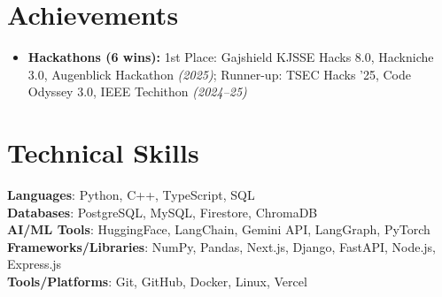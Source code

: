 \documentclass[letterpaper,11pt]{article}
\newcommand{\resumeItem}[1]{
  \item\normalsize{
    {#1 \vspace{-2pt}}
  }
}
\newcommand{\resumeSubHeadingListStart}{\begin{itemize}[leftmargin=0.15in, label={}]}
\newcommand{\resumeSubHeadingListEnd}{\end{itemize}}
\begin{document}
\section{Achievements}
    \resumeSubHeadingListStart      
\resumeItem{\textbf{Hackathons (6 wins):} 1st Place: Gajshield KJSSE Hacks 8.0, 
Hackniche 3.0, Augenblick Hackathon \textit{(2025)}; 
Runner-up: TSEC Hacks '25, Code Odyssey 3.0, IEEE Techithon \textit{(2024--25)}}
    \resumeSubHeadingListEnd

%
\section{Technical Skills}
 \begin{itemize}[leftmargin=0.15in, label={}]
    \small{\item{
     \textbf{Languages}{: Python, C++, TypeScript, SQL} \\
     \textbf{Databases}{: PostgreSQL, MySQL, Firestore, ChromaDB} \\
     \textbf{AI/ML Tools}{: HuggingFace, LangChain, Gemini API, LangGraph, PyTorch} \\
      \textbf{Frameworks/Libraries}{: NumPy, Pandas, Next.js, Django, FastAPI, Node.js, Express.js} \\
     \textbf{Tools/Platforms}{: Git, GitHub, Docker, Linux, Vercel}
    }}
 \end{itemize}




\end{document}
